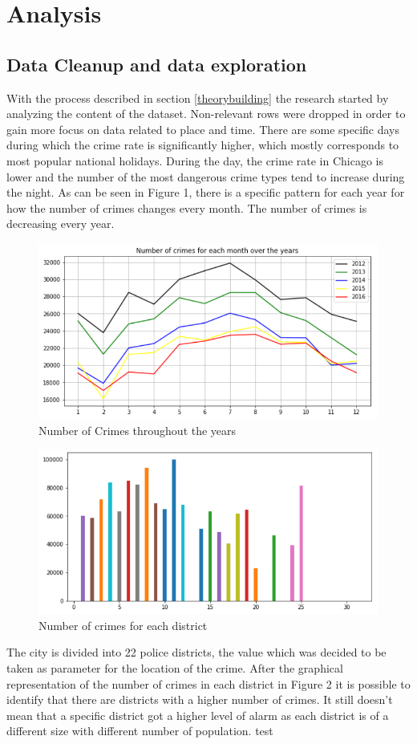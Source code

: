 \documentclass[a4paper, twocolumn]{article}
\begin{document}
\section{Analysis}
\subsection{Data Cleanup and data exploration}
With the process described in section \ref{theorybuilding} the research started by analyzing the content of the dataset. 
Non-relevant rows were dropped in order to gain more focus on data related to place and time. 
There are some specific days during which the crime rate is significantly higher, which mostly corresponds to most popular national holidays. 
During the day, the crime rate in Chicago is lower and the number of the most dangerous crime types tend to increase during the night. 
As can be seen in Figure 1, there is a specific pattern for each year for how the number of crimes changes every month. 
The number of crimes is decreasing every year. 
\begin{figure}
    \includegraphics[scale=0.3]{fig1.png}

    \caption{Number of Crimes throughout the years}
\end{figure}

\begin{figure}
    \includegraphics[scale=0.3]{fig2.png}
    \caption{Number of crimes for each district}
\end{figure}
The city is divided into 22 police districts, the value which was decided to be taken as parameter for the location of the crime.
After the graphical representation of the number of crimes in each district in Figure 2
it is possible to identify that there are districts with a higher number of crimes. 
It still doesn’t mean that a specific district got a higher level of alarm as each district is of a different size with different number of population. 
test
\end{document}

